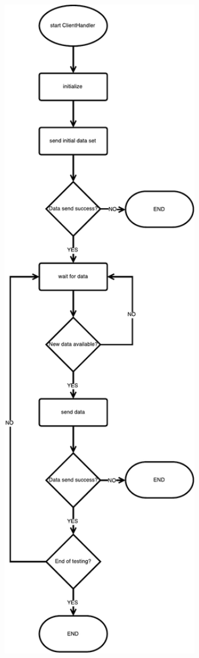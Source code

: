 	\begin{figure}
	  \centering
	  \begin{minipage}{0.45\textwidth}
	    \centering
	    \includegraphics[width=0.9\textwidth, height=0.95\textheight, keepaspectratio, center]{obrazky-figures/inrunjunit_clienthandler_flowchart.pdf}

\end{minipage}
\end{figure}

